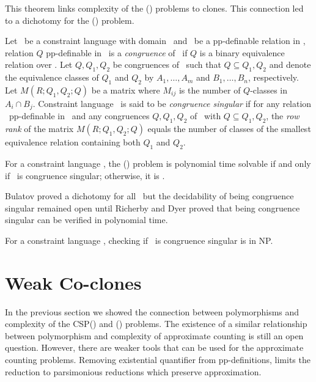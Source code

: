 This theorem links complexity of the \ccsp(\mrelset) problems to clones. This connection
led to a dichotomy for the \ccsp(\mrelset) problem.

Let \mrelset\ be a constraint language with domain \mD\ and
\mR\ be a pp-definable relation in \mrelset, relation \(Q\) pp-definable in \mrelset\
is a \emph{congruence} of \mR\ if \(Q\) is a binary equivalence relation over
\mR\@. Let \(Q,Q_1,Q_2\) be congruences of \mR\ such that
\(Q\subseteq Q_1,Q_2\) and denote the equivalence classes of
\(Q_1\) and \(Q_2\) by \(A_1,\dotsc,A_m\) and \(B_1,\dotsc,B_n\), respectively. 
Let \(M(R;Q_1,Q_2;Q)\) be a matrix where \(M_{ij}\) is the number of \(Q\)-classes in
\(A_i\cap B_j\). Constraint language \mrelset\ is said to be \emph{congruence
 singular} if for any relation \mR\ pp-definable in \mrelset\ and any congruences
\(Q,Q_1,Q_2\) of \mR\ with \(Q\subseteq Q_1,Q_2\), the
\emph{row rank} of the matrix \(M(R;Q_1,Q_2;Q)\) equals
the number of classes of the smallest equivalence relation containing
both \(Q_1\) and \(Q_2\)\@. 

\begin{theorem}
For a constraint language \mrelset,
the \ccsp(\mrelset) problem is polynomial time solvable if and only if 
\mrelset\ is congruence singular; otherwise, it is \cpc\@.
\end{theorem}

Bulatov proved a dichotomy for all \mrelset\ but the decidability of being congruence
singular remained open until Richerby and Dyer \cite{DyerR10} 
proved that being congruence singular can be verified in polynomial time.

\begin{theorem} 
For a constraint language \mrelset, checking if \mrelset\ is congruence singular is in NP.
\end{theorem}

\section{Weak Co-clones}
In the previous section we showed the connection between polymorphisms and complexity 
of the CSP(\mrelset) and \ccsp(\mrelset) problems. The existence of a similar relationship
between polymorphism and complexity of approximate counting is still an open
question. However, there are weaker tools that can be used for the approximate counting
problems. Removing existential quantifier from pp-definitions, limits the 
reduction to parsimonious reductions which preserve approximation.



